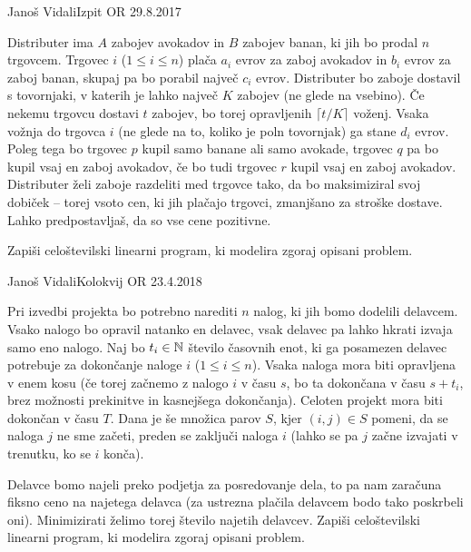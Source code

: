 \begin{naloga}{Janoš Vidali}{Izpit OR 29.8.2017}
\begin{vprasanje}[sadje]
Distributer ima $A$ zabojev avokadov in $B$ zabojev banan,
ki jih bo prodal $n$ trgovcem.
Trgovec $i$ ($1 \le i \le n$)
plača $a_i$ evrov za zaboj avokadov in $b_i$ evrov za zaboj banan,
skupaj pa bo porabil največ $c_i$ evrov.
Distributer bo zaboje dostavil s tovornjaki,
v katerih je lahko največ $K$ zabojev (ne glede na vsebino).
Če nekemu trgovcu dostavi $t$ zabojev,
bo torej opravljenih $\lceil t/K \rceil$ voženj.
Vsaka vožnja do trgovca $i$ (ne glede na to, koliko je poln tovornjak)
ga stane $d_i$ evrov.
Poleg tega bo trgovec $p$ kupil samo banane ali samo avokade,
trgovec $q$ pa bo kupil vsaj en zaboj avokadov,
če bo tudi trgovec $r$ kupil vsaj en zaboj avokadov.
Distributer želi zaboje razdeliti med trgovce tako,
da bo maksimiziral svoj dobiček
-- torej vsoto cen, ki jih plačajo trgovci,
zmanjšano za stroške dostave.
Lahko predpostavljaš, da so vse cene pozitivne.

Zapiši celoštevilski linearni program, ki modelira zgoraj opisani problem.
\end{vprasanje}
\begin{odgovor}
\end{odgovor}
\end{naloga}


\begin{naloga}{Janoš Vidali}{Kolokvij OR 23.4.2018}
\begin{vprasanje}[dodelitev]
Pri izvedbi projekta bo potrebno narediti $n$ nalog,
ki jih bomo dodelili delavcem.
Vsako nalogo bo opravil natanko en delavec,
vsak delavec pa lahko hkrati izvaja samo eno nalogo.
Naj bo $t_i \in \mathbb{N}$ število časovnih enot,
ki ga posamezen delavec potrebuje za dokončanje naloge $i$
($1 \le i \le n$).
Vsaka naloga mora biti opravljena v enem kosu
(če torej začnemo z nalogo $i$ v času $s$,
bo ta dokončana v času $s+t_i$,
brez možnosti prekinitve in kasnejšega dokončanja).
Celoten projekt mora biti dokončan v času $T$.
Dana je še množica parov $S$,
kjer $(i, j) \in S$ pomeni,
da se naloga $j$ ne sme začeti, preden se zaključi naloga $i$
(lahko se pa $j$ začne izvajati v trenutku, ko se $i$ konča).

Delavce bomo najeli preko podjetja za posredovanje dela,
to pa nam zaračuna fiksno ceno na najetega delavca
(za ustrezna plačila delavcem bodo tako poskrbeli oni).
Minimizirati želimo torej število najetih delavcev.
Zapiši celoštevilski linearni program, ki modelira zgoraj opisani problem.
\end{vprasanje}
\begin{odgovor}
\end{odgovor}
\end{naloga}


